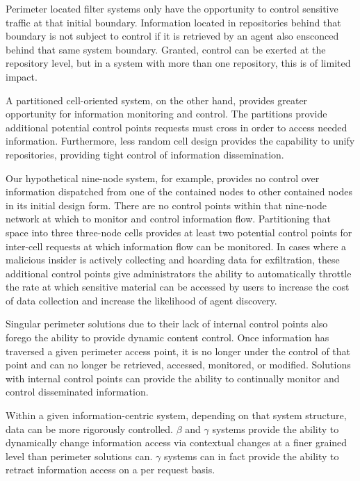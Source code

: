 Perimeter located filter systems only have the opportunity to control sensitive traffic at that initial boundary.  Information located in repositories behind that boundary is not subject to control if it is retrieved by an agent also ensconced behind that same system boundary.  Granted, control can be exerted at the repository level, but in a system with more than one repository, this is of limited impact.

A partitioned cell-oriented system, on the other hand, provides greater opportunity for information monitoring and control.  The partitions provide additional potential control points requests must cross in order to access needed information.  Furthermore, less random cell design provides the capability to unify repositories, providing tight control of information dissemination.

Our hypothetical nine-node system, for example, provides no control over information dispatched from one of the contained nodes to other contained nodes in its initial design form.  There are no control points within that nine-node network at which to monitor and control information flow.  Partitioning that space into three three-node cells provides at least two potential control points for inter-cell requests at which information flow can be monitored.  In cases where a malicious insider is actively collecting and hoarding data for exfiltration, these additional control points give administrators the ability to automatically throttle the rate at which sensitive material can be accessed by users to increase the cost of data collection and increase the likelihood of agent discovery.

Singular perimeter solutions due to their lack of internal control points also forego the ability to provide dynamic content control.  Once information has traversed a given perimeter access point, it is no longer under the control of that point and can no longer be retrieved, accessed, monitored, or modified.  Solutions with internal control points can provide the ability to continually monitor and control disseminated information.

Within a given information-centric system, depending on that system structure, data can be more rigorously controlled.  $\beta$ and $\gamma$ systems provide the ability to dynamically change information access via contextual changes at a finer grained level than perimeter solutions can.  $\gamma$ systems can in fact provide the ability to retract information access on a per request basis.

